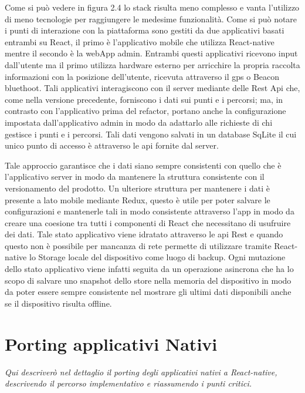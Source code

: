 \vspace{5mm}Come si può vedere in figura 2.4 lo stack risulta meno complesso e vanta l'utilizzo di meno tecnologie per raggiungere le medesime funzionalità. Come si può notare i punti di interazione con la piattaforma sono gestiti da due applicativi basati entrambi su React, il primo è l'applicativo mobile che utilizza React-native mentre il secondo è la webApp admin. Entrambi questi applicativi ricevono input dall'utente ma il primo utilizza hardware esterno per arricchire la propria raccolta informazioni con la posizione dell'utente, ricevuta attraverso il gps o Beacon bluethoot. Tali applicativi interagiscono con il server mediante delle Rest Api che, come nella versione precedente, forniscono i dati sui punti e i percorsi; ma, in contrasto con l'applicativo prima del refactor, portano anche la configurazione impostata dall'applicativo admin in modo da adattarlo alle richieste di chi gestisce i punti e i percorsi. Tali dati vengono salvati in un database SqLite il cui unico punto di accesso è attraverso le api fornite dal server. \vspace{5mm}

Tale approccio garantisce che i dati siano sempre consistenti con quello che è l'applicativo server in modo da mantenere la struttura consistente con il versionamento del prodotto. Un ulteriore struttura per mantenere i dati è presente a lato mobile mediante Redux, questo è utile per poter salvare le configurazioni e mantenerle tali in modo consistente attraverso l'app in modo da creare una coesione tra tutti i componenti di React che necessitano di usufruire dei dati. Tale stato applicativo viene idratato attraverso le api Rest e quando questo non è possibile per mancanza di rete permette di utilizzare tramite React-native lo Storage locale del dispositivo come luogo di backup. Ogni mutazione dello stato applicativo viene infatti seguita da un operazione asincrona che ha lo scopo di salvare uno snapshot dello store nella memoria del dispositivo in modo da poter essere sempre consistente nel mostrare gli ultimi dati disponibili anche se il dispositivo risulta offline.\vspace{5mm}


\section{Porting applicativi Nativi}
\emph{Qui descriverò nel dettaglio il porting degli applicativi nativi a React-native, descrivendo il percorso implementativo e riassumendo i punti critici.}
\vspace{5mm}

